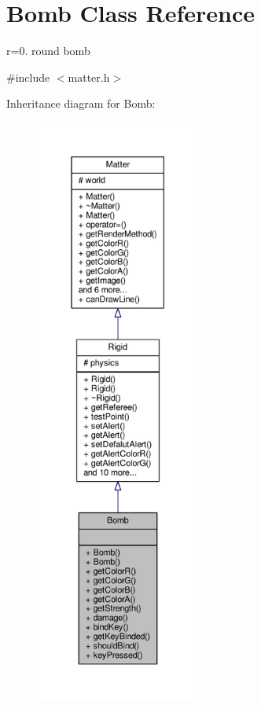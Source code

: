 \hypertarget{classBomb}{}\section{Bomb Class Reference}
\label{classBomb}


r=0. round bomb  




{\ttfamily \#include $<$matter.\+h$>$}



Inheritance diagram for Bomb\+:\nopagebreak
\begin{figure}[H]
\begin{center}
\leavevmode
\includegraphics[height=550pt]{classBomb__inherit__graph}
\end{center}
\end{figure}


